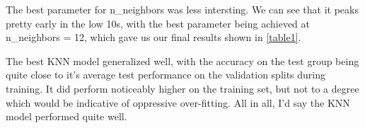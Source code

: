 \documentclass[12pt]{article}
\begin{document}
The best parameter for n\_neighbors was less intersting. We can see that it peaks pretty early in the low 10s, with 
the best parameter being achieved at n\_neighbors = 12, which gave us our final results shown in \ref{table1}.

The best KNN model generalized well, with the accuracy on the test group being quite close to it's average test performance on the 
validation splits during training. It did perform noticeably higher on the training set, but not to a degree which would 
be indicative of oppressive over-fitting. All in all, I'd say the KNN model performed quite well.


\subsection{}
\end{document}
